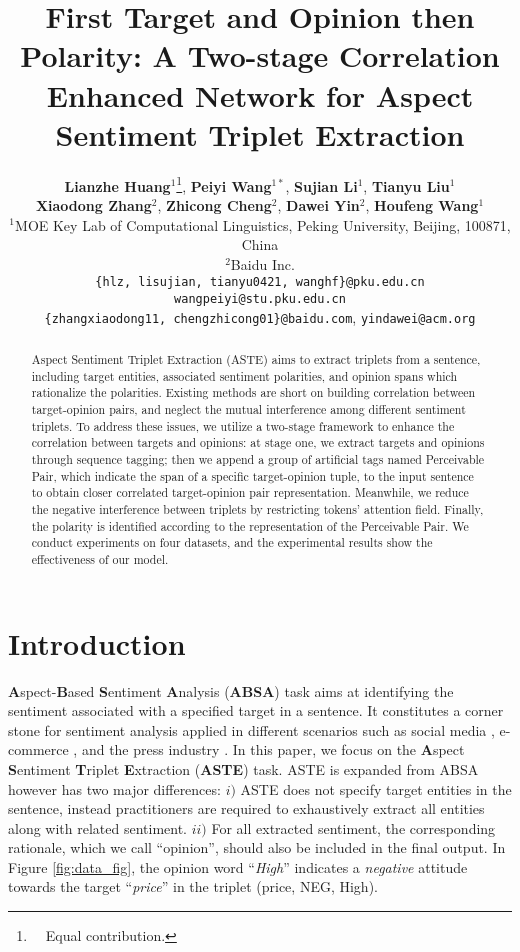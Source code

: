\documentclass[11pt]{article}
\title{First Target and Opinion then Polarity: A Two-stage Correlation Enhanced Network for Aspect Sentiment Triplet Extraction}
\author{\textbf{Lianzhe Huang}$^{1}$\thanks{~~Equal contribution.}, \textbf{Peiyi Wang}$^{1*}$, \textbf{Sujian Li}$^{1}$, \textbf{Tianyu Liu}$^{1}$ \\ \textbf{Xiaodong Zhang}$^{2}$, \textbf{Zhicong Cheng}$^{2}$, \textbf{Dawei Yin}$^{2}$, \textbf{Houfeng Wang}$^{1}$\\ 
$^1$MOE Key Lab of Computational Linguistics, Peking University, Beijing, 100871, China \\
$^2$Baidu Inc.\\
\texttt{\{hlz, lisujian, tianyu0421, wanghf\}@pku.edu.cn} \\ \texttt{wangpeiyi@stu.pku.edu.cn} \\
\texttt{\{zhangxiaodong11, chengzhicong01\}@baidu.com},  
\texttt{yindawei@acm.org}
}
\begin{document}
\maketitle

\begin{abstract}
Aspect Sentiment Triplet Extraction (ASTE) aims to extract triplets from a sentence, including target entities, associated sentiment polarities, and opinion spans which rationalize the polarities.
Existing methods are short on building correlation between target-opinion pairs, and neglect the mutual interference among different sentiment triplets.
To address these issues, we utilize a two-stage framework to enhance the correlation between targets and opinions: at stage one, we extract targets and opinions through sequence tagging; then we append a group of artificial tags named Perceivable Pair, which indicate the span of a specific target-opinion tuple, to the input sentence to obtain closer correlated target-opinion pair representation. Meanwhile, we reduce the negative interference between triplets by restricting tokens' attention field. Finally, the polarity is identified according to the representation of the Perceivable Pair. 
We conduct experiments on four datasets, and the experimental results show the effectiveness of our model. 
\end{abstract} \section{Introduction}\label{chap: intro}

\textbf{A}spect-\textbf{B}ased \textbf{S}entiment \textbf{A}nalysis (\textbf{ABSA}) \cite{liu2012sentiment,ma2017interactive,zhao2019modeling} task aims at identifying the sentiment 
associated with a specified target in a sentence.
It constitutes a corner stone for sentiment analysis \cite{feldman2013techniques,zhang2018deep} applied in different scenarios such as social media \cite{agarwal2011sentiment}, e-commerce \cite{fang2015sentiment}, and the press industry \cite{godbole2007large}. 
In this paper, we focus on the \textbf{A}spect \textbf{S}entiment \textbf{T}riplet \textbf{E}xtraction (\textbf{ASTE}) task. ASTE is expanded from ABSA however has two major differences: $i)$ ASTE does not specify target entities in the sentence, instead practitioners are required to exhaustively extract all entities along with related sentiment. $ii)$ For all extracted sentiment, the corresponding rationale, which we call ``opinion'', should also be included in the final output. In Figure \ref{fig:data_fig}, the opinion word ``\textit{High}'' indicates a \textit{negative} attitude towards the target ``\textit{price}'' in the triplet {(price, NEG, High)}.
\end{document}

